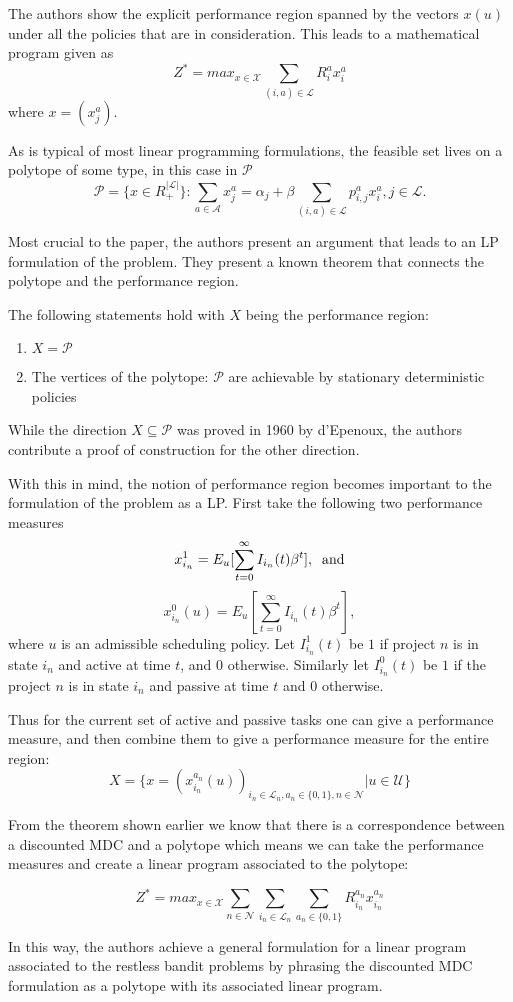 The authors show the explicit performance region spanned by the vectors $x(u)$ under all the policies that are in consideration. This leads to a mathematical program given as
$$Z^* = max_{x \in \mathcal{X}}\sum_{(i,a)\in \mathcal{L}}R_i^a x_i^a$$ 
where $x = (x_j^a).$

As is typical of most linear programming formulations, the feasible set lives on a polytope of some type, in this case in $\mathcal {P}$ 
$$\mathcal{P} = \{ x \in R_+^{|\mathcal{L}|} \}: \sum_{a \in \mathcal{A}} x_j^a = \alpha_j 
+ \beta \sum_{(i,a) \in \mathcal{L}} p_{i,j}^a x_i^a, j  \in \mathcal{L}.$$ 

Most crucial to the paper, the authors present an argument that leads to an LP formulation of the problem.
They present a known theorem that connects the polytope and the performance region. 
\begin{theorem}
	The following statements hold with $X$ being the performance region:
		\begin{enumerate}
			\item $X = \mathcal{P}$
			\item The vertices of the polytope: $\mathcal{P}$ are achievable by stationary deterministic policies
		\end{enumerate}
\end{theorem}
While the direction $X\subseteq\mathcal{P}$ was proved in 1960 by d'Epenoux, the authors contribute a proof of construction for the other direction. 

With this in mind, the notion of performance region becomes important to the formulation of the problem as a LP. First take the following two performance measures
$$x_{i_n}^1 = E_u[\sum_{t=0}^{\infty} I_{i_n}(t)\beta^t],\text{\;\;and}$$
$$x_{i_n}^0(u) = E_u[\sum_{t=0}^{\infty}I_{i_n}(t) \beta^t],$$ 
where $u$ is an admissible scheduling policy. Let
$I_{i_n}^1(t)$ be $1$ if project $n$ is in state $i_n$ and active at time $t$, and $0$ otherwise. Similarly let $I_{i_n}^0(t)$ be $1$ if the project $n$ is in state $i_n$ and passive at time $t$ and $0$ otherwise.

Thus for the current set of active and passive tasks one can give a performance measure, and then combine them to give a performance measure for the entire region: 
$$
X = \{x = (x_{i_n}^{a_n}(u))_{i_n \in \mathcal{L}_n, a_n \in \{0,1\}, n \in \mathcal{N}}|u \in \mathcal{U}\}$$

From the theorem shown earlier we know that there is a correspondence between a discounted MDC and a polytope which means we can take the performance measures and create a linear program associated to the polytope:

	$$Z^* = max_{x \in \mathcal{X}} \sum_{n \in \mathcal{N}} \sum_{i_n \in \mathcal{L}_n} 
\sum_{a_n \in \{ 0,1\}} R_{i_n}^{a_n} x_{i_n}^{a_n}$$

In this way, the authors achieve a general formulation for a linear program associated to the restless bandit problems by phrasing the discounted MDC formulation as a polytope with its associated linear program. 
